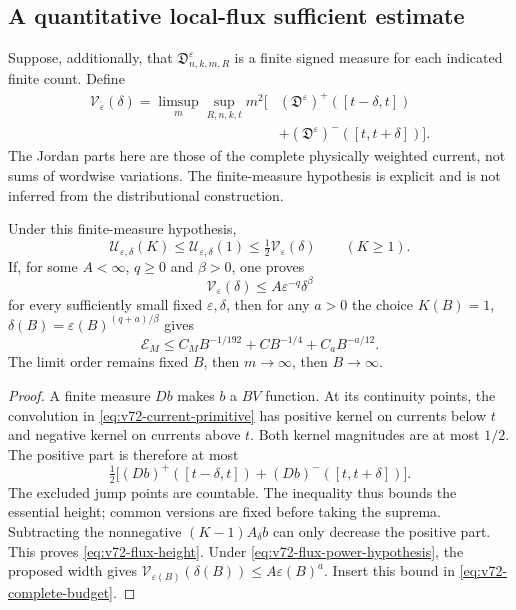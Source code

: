 \subsection{A quantitative local-flux sufficient estimate}
Suppose, additionally, that $\mathfrak D^\varepsilon_{n,k,m,R}$
is a finite signed measure for each indicated finite count. Define
\begin{equation}\label{eq:v72-directed-flux-height}
 \begin{split}
 \mathcal V_\varepsilon(\delta)=\limsup_m\sup_{R,n,k,t}m^2
 \bigl[& (\mathfrak D^\varepsilon)^+([t-\delta,t])\\
       &+(\mathfrak D^\varepsilon)^-([t,t+\delta])\bigr].
 \end{split}
\end{equation}
The Jordan parts here are those of the complete physically weighted
current, not sums of wordwise variations. The finite-measure
hypothesis is explicit and is not inferred from the distributional
construction.

\begin{proposition}
\label{prop:v72-flux-height}
Under this finite-measure hypothesis,
\begin{equation}\label{eq:v72-flux-height}
 \mathcal U_{\varepsilon,\delta}(K)
           \le\mathcal U_{\varepsilon,\delta}(1)
           \le\tfrac12\mathcal V_\varepsilon(\delta)
                  \qquad(K\ge1).
\end{equation}
If, for some $A<\infty$, $q\ge0$ and $\beta>0$, one proves
\begin{equation}\label{eq:v72-flux-power-hypothesis}
 \mathcal V_\varepsilon(\delta)
                  \le A\varepsilon^{-q}\delta^\beta
\end{equation}
for every sufficiently small fixed $\varepsilon,\delta$, then
for any $a>0$ the choice
$K(B)=1$, $\delta(B)=\varepsilon(B)^{(q+a)/\beta}$ gives
\begin{equation}\label{eq:v72-flux-power-consequence}
 \mathcal E_M\le C_MB^{-1/192}+CB^{-1/4}+C_aB^{-a/12}.
\end{equation}
The limit order remains fixed $B$, then $m\to\infty$, then
$B\to\infty$.
\end{proposition}
\begin{proof}
A finite measure $Db$ makes $b$ a $BV$ function. At its continuity
points, the convolution in \eqref{eq:v72-current-primitive} has
positive kernel on currents below $t$ and negative kernel on currents
above $t$. Both kernel magnitudes are at most $1/2$. The positive
part is therefore at most
\[
 \tfrac12\bigl[(Db)^+([t-\delta,t])+(Db)^-([t,t+\delta])\bigr].
\]
The excluded jump points are countable. The inequality thus bounds
the essential height; common versions are fixed before taking the
suprema. Subtracting the nonnegative $(K-1)A_\delta b$ can only
decrease the positive part. This proves \eqref{eq:v72-flux-height}.
Under \eqref{eq:v72-flux-power-hypothesis}, the proposed width gives
$\mathcal V_{\varepsilon(B)}(\delta(B))\le A\varepsilon(B)^a$.
Insert this bound in \eqref{eq:v72-complete-budget}.
\end{proof}

